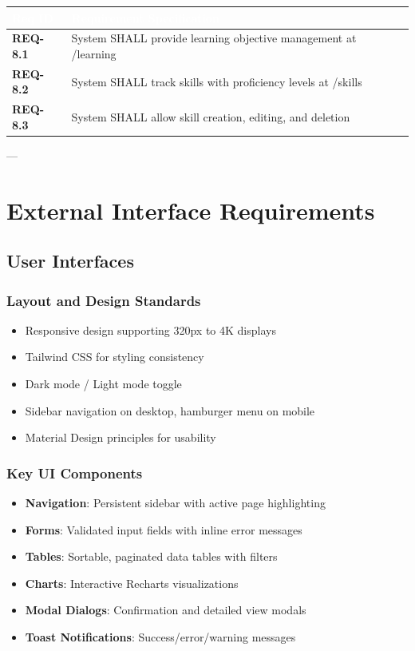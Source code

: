 \documentclass[12pt,a4paper]{article}
\begin{document}
\vspace{0.3em}
\begin{center}
\begin{tabular}{|l|p{11cm}|}
\hline
\rowcolor{deepblue}
\textcolor{white}{\textbf{Req ID}} & \textcolor{white}{\textbf{Requirement Specification}} \\
\hline
\rowcolor{lightgray}
\textbf{REQ-8.1} & System SHALL provide learning objective management at /learning \\
\hline
\textbf{REQ-8.2} & System SHALL track skills with proficiency levels at /skills \\
\hline
\rowcolor{lightgray}
\textbf{REQ-8.3} & System SHALL allow skill creation, editing, and deletion \\
\hline
\end{tabular}
\end{center}

---

\newpage
\section{External Interface Requirements}

\subsection{User Interfaces}

\subsubsection{Layout and Design Standards}
\begin{itemize}
    \item Responsive design supporting 320px to 4K displays
    \item Tailwind CSS for styling consistency
    \item Dark mode / Light mode toggle
    \item Sidebar navigation on desktop, hamburger menu on mobile
    \item Material Design principles for usability
\end{itemize}

\subsubsection{Key UI Components}
\begin{itemize}
    \item \textbf{Navigation}: Persistent sidebar with active page highlighting
    \item \textbf{Forms}: Validated input fields with inline error messages
    \item \textbf{Tables}: Sortable, paginated data tables with filters
    \item \textbf{Charts}: Interactive Recharts visualizations
    \item \textbf{Modal Dialogs}: Confirmation and detailed view modals
    \item \textbf{Toast Notifications}: Success/error/warning messages
\end{itemize}
\end{document}
